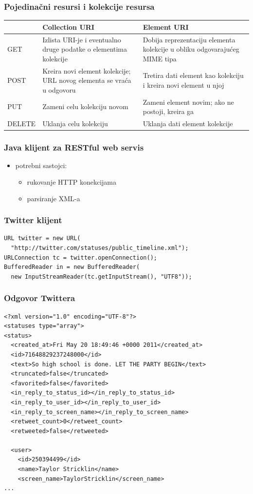 \documentclass[compress]{beamer}
\begin{document}
\begin{frame}[shrink=10]
  \frametitle{Pojedinačni resursi i kolekcije resursa}
\begin{center}
\begin{tabular}{l|p{5cm}|p{5cm}}
 & Collection URI & Element URI \\ \hline
GET & Izlista URI-je i eventualno druge podatke o elementima kolekcije & Dobija reprezentaciju elementa kolekcije u obliku odgovarajućeg MIME tipa \\ \hline
POST & Kreira novi element kolekcije; URL novog elementa se vraća u odgovoru & Tretira dati element kao kolekciju i kreira novi element u njoj \\ \hline
PUT & Zameni celu kolekciju novom & Zameni element novim; ako ne postoji, kreira ga \\ \hline
DELETE & Uklanja celu kolekciju & Uklanja dati element kolekcije
\end{tabular}
\end{center}
\end{frame}

\begin{frame}
  \frametitle{Java klijent za RESTful web servis}
\begin{itemize}
\item potrebni sastojci:
\begin{itemize}
\item rukovanje HTTP konekcijama
\item parsiranje XML-a
\end{itemize}
\end{itemize}
\end{frame}

\begin{frame}[fragile]
  \frametitle{Twitter klijent}
\begin{verbatim}
URL twitter = new URL(
  "http://twitter.com/statuses/public_timeline.xml");
URLConnection tc = twitter.openConnection();
BufferedReader in = new BufferedReader(
  new InputStreamReader(tc.getInputStream(), "UTF8"));
\end{verbatim}
\end{frame}

\begin{frame}[fragile,shrink=20]
  \frametitle{Odgovor Twittera}
\begin{verbatim}
<?xml version="1.0" encoding="UTF-8"?>
<statuses type="array">
<status>
  <created_at>Fri May 20 18:49:46 +0000 2011</created_at>
  <id>71648829237248000</id>
  <text>So high school is done. LET THE PARTY BEGIN</text>
  <truncated>false</truncated>
  <favorited>false</favorited>
  <in_reply_to_status_id></in_reply_to_status_id>
  <in_reply_to_user_id></in_reply_to_user_id>
  <in_reply_to_screen_name></in_reply_to_screen_name>
  <retweet_count>0</retweet_count>
  <retweeted>false</retweeted>

  <user>
    <id>250394499</id>
    <name>Taylor Stricklin</name>
    <screen_name>TaylorStricklin</screen_name>
...
\end{verbatim}
\end{frame}
\end{document}
